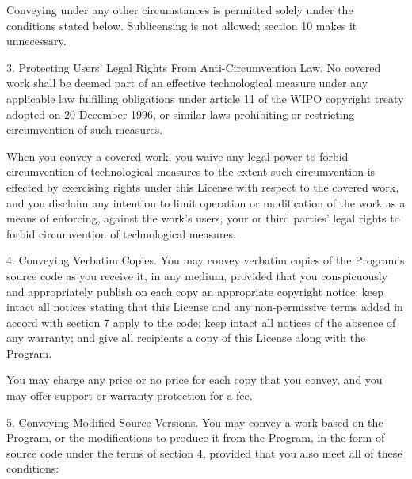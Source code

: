 Conveying under any other circumstances is permitted solely under the conditions stated below. Sublicensing is not allowed; section 10 makes it unnecessary.

3. Protecting Users' Legal Rights From Anti-Circumvention Law.
No covered work shall be deemed part of an effective technological measure under any applicable law fulfilling obligations under article 11 of the WIPO copyright treaty adopted on 20 December 1996, or similar laws prohibiting or restricting circumvention of such measures.

When you convey a covered work, you waive any legal power to forbid circumvention of technological measures to the extent such circumvention is effected by exercising rights under this License with respect to the covered work, and you disclaim any intention to limit operation or modification of the work as a means of enforcing, against the work's users, your or third parties' legal rights to forbid circumvention of technological measures.

4. Conveying Verbatim Copies.
You may convey verbatim copies of the Program's source code as you receive it, in any medium, provided that you conspicuously and appropriately publish on each copy an appropriate copyright notice; keep intact all notices stating that this License and any non-permissive terms added in accord with section 7 apply to the code; keep intact all notices of the absence of any warranty; and give all recipients a copy of this License along with the Program.

You may charge any price or no price for each copy that you convey, and you may offer support or warranty protection for a fee.

5. Conveying Modified Source Versions.
You may convey a work based on the Program, or the modifications to produce it from the Program, in the form of source code under the terms of section 4, provided that you also meet all of these conditions:


